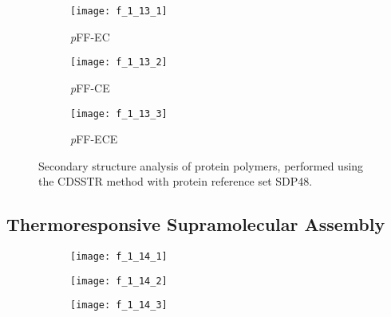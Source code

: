 \begin{refsection}
\begin{figure}[h!]
    \centering
    \begin{subfigure}[b]{0.32\textwidth}
        \centering
        \texttt{[image: f\_1\_13\_1]}
        \caption{\emph{p}FF-EC}
        \label{fig:CDcomp_ECpFF}
    \end{subfigure}
    \begin{subfigure}[b]{0.32\textwidth}
        \centering
        \texttt{[image: f\_1\_13\_2]}
        \caption{\emph{p}FF-CE}
        \label{fig:CDcomp_CEpFF}
    \end{subfigure}
    \begin{subfigure}[b]{0.32\textwidth}
        \centering
        \texttt{[image: f\_1\_13\_3]}
        \caption{\emph{p}FF-ECE}
        \label{fig:CDcomp_ECEpFF}
    \end{subfigure}
    \caption{Secondary structure analysis of protein polymers, performed using
    the CDSSTR method with protein reference set SDP48.}\label{fig:CD_computation}
\end{figure}
\subsection{Thermoresponsive Supramolecular Assembly}
\begin{figure}[h!]
    \centering
    \begin{subfigure}[b]{0.32\textwidth}
        \texttt{[image: f\_1\_14\_1]}
        \caption{}
        \label{fig:LCST_ECpFF}
    \end{subfigure}
    \begin{subfigure}[b]{0.32\textwidth}
        \texttt{[image: f\_1\_14\_2]}
        \caption{}
        \label{fig:LCST_CEpFF}
    \end{subfigure}
    \begin{subfigure}[b]{0.32\textwidth}
        \texttt{[image: f\_1\_14\_3]}
        \caption{}
        \label{fig:LCST_ECEpFF}
    \end{subfigure}


\end{figure}
\end{refsection}
